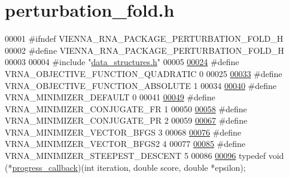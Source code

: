 \hypertarget{perturbation__fold_8h_source}{}\section{perturbation\+\_\+fold.\+h}
\label{perturbation__fold_8h_source}

\begin{DoxyCode}
00001 \textcolor{preprocessor}{#ifndef VIENNA\_RNA\_PACKAGE\_PERTURBATION\_FOLD\_H}
00002 \textcolor{preprocessor}{#define VIENNA\_RNA\_PACKAGE\_PERTURBATION\_FOLD\_H}
00003 
00004 \textcolor{preprocessor}{#include "\hyperlink{data__structures_8h}{data\_structures.h}"}
00005 
\hypertarget{perturbation__fold_8h_source.tex_l00024}{}\hyperlink{group__perturbation_ga81e10993d1ae728e4e02022b33155a12}{00024} \textcolor{preprocessor}{#define VRNA\_OBJECTIVE\_FUNCTION\_QUADRATIC 0}
00025 
\hypertarget{perturbation__fold_8h_source.tex_l00033}{}\hyperlink{group__perturbation_gac070dfb9cafaeb14d5652bd9adf0f6b1}{00033} \textcolor{preprocessor}{#define VRNA\_OBJECTIVE\_FUNCTION\_ABSOLUTE 1}
00034 
\hypertarget{perturbation__fold_8h_source.tex_l00040}{}\hyperlink{group__perturbation_gae5126200d80dbb282f46083fffc606bf}{00040} \textcolor{preprocessor}{#define VRNA\_MINIMIZER\_DEFAULT 0}
00041 
\hypertarget{perturbation__fold_8h_source.tex_l00049}{}\hyperlink{group__perturbation_gab1d89db58e8c497795a5005f5dbc8c4a}{00049} \textcolor{preprocessor}{#define VRNA\_MINIMIZER\_CONJUGATE\_FR 1}
00050 
\hypertarget{perturbation__fold_8h_source.tex_l00058}{}\hyperlink{group__perturbation_ga5aaeafe1b0aa77a5cda18943ff94b02f}{00058} \textcolor{preprocessor}{#define VRNA\_MINIMIZER\_CONJUGATE\_PR 2}
00059 
\hypertarget{perturbation__fold_8h_source.tex_l00067}{}\hyperlink{group__perturbation_ga9be8a702cddf58235571ace11cc41b22}{00067} \textcolor{preprocessor}{#define VRNA\_MINIMIZER\_VECTOR\_BFGS 3}
00068 
\hypertarget{perturbation__fold_8h_source.tex_l00076}{}\hyperlink{group__perturbation_ga7b0a65c6c92fa1d8012383ba9d3dcb4f}{00076} \textcolor{preprocessor}{#define VRNA\_MINIMIZER\_VECTOR\_BFGS2 4}
00077 
\hypertarget{perturbation__fold_8h_source.tex_l00085}{}\hyperlink{group__perturbation_ga9ecd2144c2ebed7533233da3986521b0}{00085} \textcolor{preprocessor}{#define VRNA\_MINIMIZER\_STEEPEST\_DESCENT 5}
00086 
\hypertarget{perturbation__fold_8h_source.tex_l00096}{}\hyperlink{group__perturbation_gaa715397c7afd2d2955c315512a3d571a}{00096} \textcolor{keyword}{typedef} void (*\hyperlink{group__perturbation_gaa715397c7afd2d2955c315512a3d571a}{progress\_callback})(\textcolor{keywordtype}{int} iteration, \textcolor{keywordtype}{double} score, \textcolor{keywordtype}{double} *epsilon);

\end{DoxyCode}
